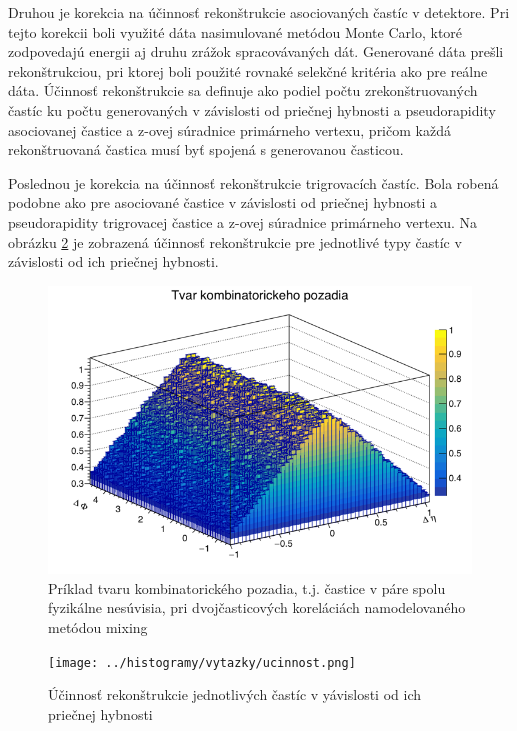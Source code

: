 \documentclass[thesismargins, thesislinespacing]{rnthesis}
\begin{document}
Druhou je korekcia na účinnosť rekonštrukcie asociovaných častíc v detektore. Pri tejto korekcii boli využité dáta nasimulované metódou Monte Carlo, ktoré zodpovedajú energii aj druhu zrážok spracovávaných dát. Generované dáta prešli \-re\-kon\-štruk\-ciou, pri ktorej boli použité rovnaké selekčné kritéria ako pre reálne dáta. Účinnosť re\-kon\-štruk\-cie sa definuje ako podiel počtu zrekonštruovaných častíc ku počtu generovaných v závislosti od priečnej hybnosti a  pseudorapidity asociovanej častice a z-ovej súradnice primárneho vertexu, pričom každá rekonštruovaná častica musí byť spojená s generovanou časticou.  

Poslednou je korekcia na účinnosť rekonštrukcie trigrovacích častíc. Bola robená podobne ako pre asociované častice v závislosti od priečnej hybnosti a  pseudorapidity trigrovacej častice a z-ovej súradnice primárneho vertexu. Na obrázku \ref{uc} je zobrazená účinnosť rekonštrukcie pre jednotlivé typy častíc v závislosti od ich priečnej hybnosti.

\begin{figure}[hbtp!]
	\centering
	\includegraphics[scale=0.5]{./Obrazky_praca/pozadie.png}
	\caption{Príklad tvaru kombinatorického pozadia, t.j. častice v páre spolu fyzikálne nesúvisia, pri dvojčasticových koreláciách namodelovaného metódou mixing}
	\label{pozadie}
\end{figure}

\begin{figure}[hbtp!]
	\centering
	\texttt{[image: ../histogramy/vytazky/ucinnost.png]}
	\caption{Účinnosť rekonštrukcie jednotlivých častíc v yávislosti od ich priečnej hybnosti}
	\label{uc}
\end{figure}
\end{document}
